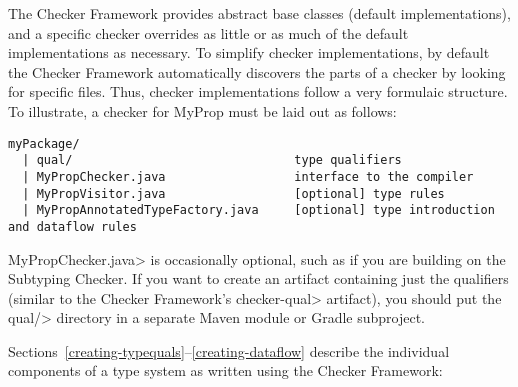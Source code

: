 The Checker Framework provides abstract base classes (default
implementations), and a specific checker overrides as little or as much of
the default implementations as necessary.
To simplify checker implementations, by default the Checker Framework
automatically discovers the parts of a checker by looking for specific files.
Thus, checker implementations follow a very formulaic structure.
To illustrate, a checker for MyProp must be laid out as follows:
%
\begin{Verbatim}
myPackage/
  | qual/                               type qualifiers
  | MyPropChecker.java                  interface to the compiler
  | MyPropVisitor.java                  [optional] type rules
  | MyPropAnnotatedTypeFactory.java     [optional] type introduction and dataflow rules
\end{Verbatim}
%
\<MyPropChecker.java> is occasionally optional, such as if you are
building on the Subtyping Checker.  If you want to create an artifact
containing just the qualifiers (similar to the Checker Framework's
\<checker-qual> artifact), you should put the \<qual/> directory in a
separate Maven module or Gradle subproject.

Sections~\ref{creating-typequals}--\ref{creating-dataflow} describe
the individual components of a type system as written using the Checker
Framework:

